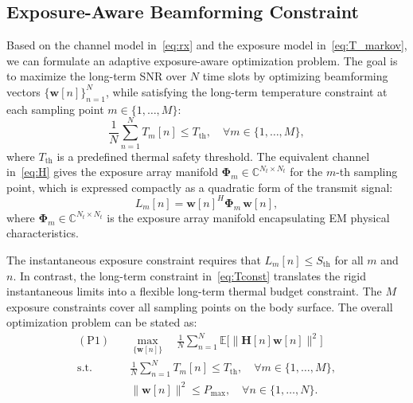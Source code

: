 \documentclass[journal]{IEEEtran}
\begin{document}
\subsection{Exposure-Aware Beamforming Constraint}

Based on the channel model in~\eqref{eq:rx} and the exposure model in~\eqref{eq:T_markov}, we can formulate an adaptive exposure-aware optimization problem. The goal is to maximize the long-term SNR over $N$ time slots by optimizing beamforming vectors $\{\mathbf{w}[n]\}_{n=1}^N$, while satisfying the long-term temperature constraint at each sampling point $m \in \{1, \ldots, M\}$:
\begin{equation}
    \frac{1}{N}\sum_{n=1}^N T_m[n] \leq T_{\text{th}}, \quad \forall m \in \{1, \ldots, M\},
    \label{eq:Tconst}
\end{equation}
where $T_{\text{th}}$ is a predefined thermal safety threshold. The equivalent channel in~\eqref{eq:H} gives the exposure array manifold $\boldsymbol{\Phi}_m \in \mathbb{C}^{N_t \times N_t}$ for the $m$-th sampling point, which is expressed compactly as a quadratic form of the transmit signal:
\begin{equation}
    L_m[n] = \mathbf{w}[n]^H\boldsymbol{\Phi}_m\,\mathbf{w}[n],
    \label{eq:PD}
\end{equation}
where $\boldsymbol{\Phi}_m \in \mathbb{C}^{N_t \times N_t}$ is the exposure array manifold encapsulating EM physical characteristics.

The instantaneous exposure constraint requires that $L_m[n] \leq S_{\text{th}}$ for all $m$ and $n$. In contrast, the long-term constraint in~\eqref{eq:Tconst} translates the rigid instantaneous limits into a flexible long-term thermal budget constraint. The $M$ exposure constraints cover all sampling points on the body surface. The overall optimization problem can be stated as:
\begin{equation}
\begin{aligned}
    (\text{P1}) \quad & \max_{\{\mathbf{w}[n]\}} \quad \frac{1}{N}\sum_{n=1}^{N}\mathbb{E}\bigl[\|\mathbf{H}[n]\mathbf{w}[n]\|^2\bigr] \\
    \text{s.t.} \quad & \frac{1}{N}\sum_{n=1}^{N} T_m[n] \leq T_{\text{th}}, \quad \forall m \in \{1, \ldots, M\}, \\
    & \|\mathbf{w}[n]\|^2 \leq P_{\max}, \quad \forall n \in \{1, \ldots, N\}.
\end{aligned}
\label{eq:P1}
\end{equation}
\end{document}
